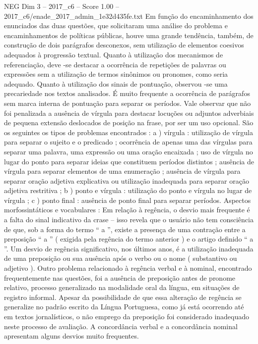 \begin{textsample}{NEG Dim 3 – 2017\_c6 – Score 1.00 – 2017\_c6/enade\_2017\_admin\_1e32d435fe.txt}
Em função do encaminhamento dos enunciados das duas questões, que solicitaram uma análise do problema e encaminhamentos de políticas públicas, houve uma grande tendência, também, de construção de dois parágrafos desconexos, sem utilização de elementos coesivos adequados à progressão textual.
Quanto à utilização dos mecanismos de referenciação, deve -se destacar a ocorrência de repetições de palavras ou expressões sem a utilização de termos sinônimos ou pronomes, como seria adequado.
Quanto à utilização dos sinais de pontuação, observou -se uma precariedade nos textos analisados.
É muito frequente a ocorrência de parágrafos sem marca interna de pontuação para separar os períodos.
Vale observar que não foi penalizada a ausência de vírgula para destacar locuções ou adjuntos adverbiais de pequena extensão deslocados de posição na frase, por ser um uso opcional.
São os seguintes os tipos de problemas encontrados : a ) vírgula : utilização de vírgula para separar o sujeito e o predicado ; ocorrência de apenas uma das vírgulas para separar uma palavra, uma expressão ou uma oração encaixada ; uso de vírgula no lugar do ponto para separar ideias que constituem períodos distintos ; ausência de vírgula para separar elementos de uma enumeração ; ausência de vírgula para separar oração adjetiva explicativa ou utilização inadequada para separar oração adjetiva restritiva ; b ) ponto e vírgula : utilização do ponto e vírgula no lugar de vírgula ; c ) ponto final : ausência de ponto final para separar períodos.
Aspectos morfossintáticos e vocabulares : Em relação à regência, o desvio mais frequente é a falta do sinal indicativo da crase – isso revela que o usuário não tem consciência de que, sob a forma do termo “ a ”, existe a presença de uma contração entre a preposição “ a ” ( exigida pela regência do termo anterior ) e o artigo definido “ a ”.
Um desvio de regência significativo, nos últimos anos, é a utilização inadequada de uma preposição ou sua ausência após o verbo ou o nome ( substantivo ou adjetivo ).
Outro problema relacionado à regência verbal e à nominal, encontrado frequentemente nas questões, foi a ausência de preposição antes de pronome relativo, processo generalizado na modalidade oral da língua, em situações de registro informal.
Apesar da possibilidade de que essa alteração de regência se generalize no padrão escrito da Língua Portuguesa, como já está ocorrendo até em textos jornalísticos, o não emprego da preposição foi considerado inadequado neste processo de avaliação.
A concordância verbal e a concordância nominal apresentam alguns desvios muito frequentes.

\end{textsample}
